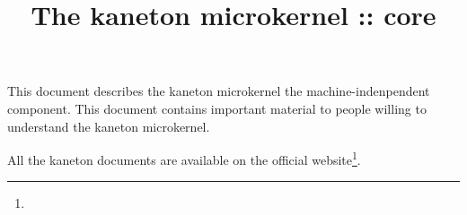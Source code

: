 %
%
%
%
%
%

%
%

%
%

\def\path{../..}

%
%



%
%


%
%

\title{The kaneton microkernel :: core \\
       \version
       \logo}

%
%



%
%

\maketitle

%
%

This document describes the kaneton microkernel  \ie{}
the machine-indenpendent component. This document contains important
material to people willing to understand the kaneton microkernel.

\-

All the kaneton documents are available on
  the official website\footnote{}.

%
%

\tableofcontents

%
%

\indentation{}

%
%

%



